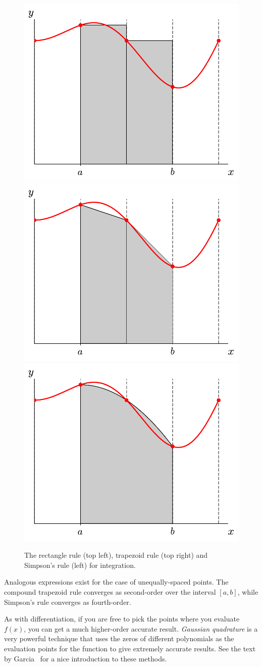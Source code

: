 \begin{figure}
\centering
\includegraphics[width=0.49\linewidth]{rectangle}
\includegraphics[width=0.49\linewidth]{trapezoid} \\
\includegraphics[width=0.49\linewidth]{simpsons}
\begin{minipage}[b]{0.49\linewidth}
\caption[Integration rules]{\label{fig:integration} The rectangle rule
  (top left), trapezoid rule (top right) and Simpson's rule (left) for
  integration.}
\end{minipage}
\end{figure}


Analogous expressions exist for the case of unequally-spaced points.
The compound trapezoid rule converges as second-order over the
interval $[a,b]$, while Simpson's rule converges as fourth-order.

As with differentiation, if you are free to pick the points where you
evaluate $f(x)$, you can get a much higher-order accurate result.
{\em Gaussian quadrature} is a very powerful technique that uses the
zeros of different polynomials as the evaluation points for the
function to give extremely accurate results.  See the text by
Garcia~\cite{garcia} for a nice introduction to these methods.



